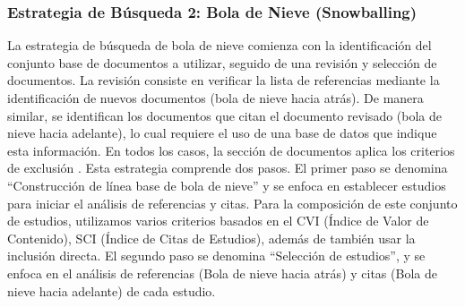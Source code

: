 \subsubsection{Estrategia de Búsqueda 2: Bola de Nieve (Snowballing)}

\newcommand{\csiSelected}{24} %
\newcommand{\newSnowballStudies}{3} %
\newcommand{\firstBackwardSnowballStudies}{3} %
\newcommand{\firstForwardSnowballStudies}{4} %
\newcommand{\secondBackwardSnowballStudies}{3} %
\newcommand{\secondForwardSnowballStudies}{5} %

\newcommand{\firstSnowballIterationStudies}{\fpeval{\firstBackwardSnowballStudies+\firstForwardSnowballStudies}}
\newcommand{\secondSnowballIterationStudies}{\fpeval{\secondBackwardSnowballStudies+\secondForwardSnowballStudies}}

\newcommand{\snowballNewStudies}{\fpeval{\firstSnowballIterationStudies+\secondSnowballIterationStudies}}

La estrategia de búsqueda de bola de nieve comienza con la identificación del conjunto base de documentos a utilizar, seguido de una revisión y selección de documentos. La revisión consiste en verificar la lista de referencias mediante la identificación de nuevos documentos (bola de nieve hacia atrás). De manera similar, se identifican los documentos que citan el documento revisado (bola de nieve hacia adelante), lo cual requiere el uso de una base de datos que indique esta información. En todos los casos, la sección de documentos aplica los criterios de exclusión \cite{Wohlin-01}.
Esta estrategia comprende dos pasos. El primer paso se denomina ``Construcción de línea base de bola de nieve'' y se enfoca en establecer estudios para iniciar el análisis de referencias y citas. Para la composición de este conjunto de estudios, utilizamos varios criterios basados en el CVI (Índice de Valor de Contenido), SCI (Índice de Citas de Estudios), además de también usar la inclusión directa. El segundo paso se denomina ``Selección de estudios'', y se enfoca en el análisis de referencias (Bola de nieve hacia atrás) y citas (Bola de nieve hacia adelante) de cada estudio.


